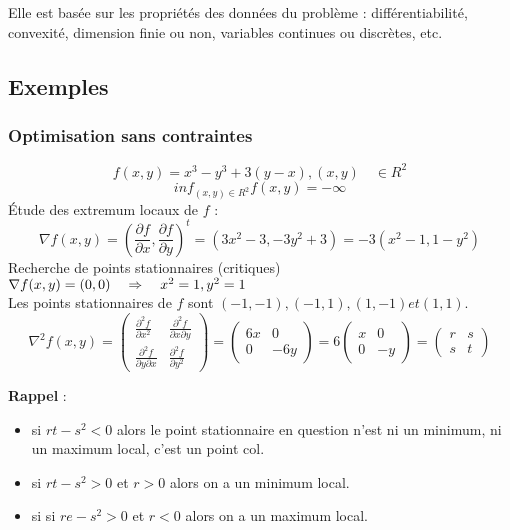 	Elle est basée sur les propriétés des données du problème : différentiabilité, convexité, dimension finie ou non, variables continues ou discrètes, etc.
	
	
	\subsection{Exemples}
	
		\subsubsection{Optimisation sans contraintes}
		
	\[f(x, y) = x^3 - y^3 + 3(y-x), (x, y) \quad\in R^2\]
	\[inf_{(x, y) \in R^2} f(x,y) = -\infty \]
	Étude des extremum locaux de $f$ :
	\[\nabla f(x, y) = (\frac{\partial f}{\partial x}, \frac{\partial f}{\partial y})^t = (3x^2-3, -3y^2 +3)=-3(x^2-1 , 1-y^2)\]
	Recherche de points stationnaires (critiques) $\nabla f(x, y) = ( 0, 0) \quad\Rightarrow\quad x^2 = 1 , y^2 = 1$ \\
	Les points stationnaires de $f$ sont $(-1, -1), (-1, 1), (1, -1) et (1, 1)$.
	\[\nabla^2 f(x, y) = \begin{pmatrix} \frac{\partial^2 f}{\partial x^2} &\frac{\partial^2 f}{\partial x \partial y} \\ \frac{\partial^2 f}{\partial y \partial x} & \frac{\partial^2 f}{\partial y^2} \end{pmatrix} 
	= \begin{pmatrix} 6x & 0 \\ 0 & -6y \end{pmatrix}
	= 6\begin{pmatrix} x & 0 \\ 0 & -y\end{pmatrix} 
	= \begin{pmatrix} r & s \\ s & t\end{pmatrix}\]

	
	\textbf{Rappel} :
	\begin{itemize}
		\item si $rt-s^2 <0$ alors le point stationnaire en question n'est ni un minimum, ni un maximum local, c'est un point \og col\fg.
		\item si $rt -s^2 >0$ et $r>0$ alors on a un minimum local. 
		\item si si $re -s^2 >0$ et $r<0$ alors on a un maximum local.
	\end{itemize}
	
